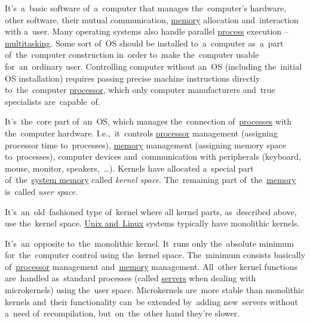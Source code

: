 
\label{os}
It's~a~basic software of~a~computer that manages the~computer's hardware, other software, their mutual communication, \hyperref[systemmemory]{memory} allocation and~interaction with a~user.
Many operating systems also handle parallel \hyperref[applicationprocessprogramservicethread]{process} execution -- \hyperref[multitasking]{multitasking}.
Some sort of~OS should be installed to~a~computer as~a~part of~the~computer construction in~order to~make the~computer usable for~an~ordinary user.
Controlling computer without an~OS (including the~initial OS installation) requires passing precise machine instructions directly to~the~computer \hyperref[processorcpucore]{processor}, which only computer manufacturers and~true specialists are~capable~of.

\label{kernel}
It's~the~core part of~an~OS, which manages the~connection of~\hyperref[applicationprocessprogramservicethread]{processes} with the~computer hardware.
I.e.,~it~controls \hyperref[processorcpucore]{processor} management (assigning processor time to~processes), \hyperref[systemmemory]{memory} management (assigning memory space to~processes), computer devices and~communication with peripherals (keyboard, mouse, monitor, speakers,~\dots).
Kernels have allocated a~special part of~the~\hyperref[systemmemory]{system memory} called \textit{kernel space}.
The~remaining part of~the~\hyperref[systemmemory]{memory} is~called \textit{user space}.

\label{monolithickernel}
It's~an~old--fashioned type of~kernel where all kernel parts, as~described above, use the~kernel space.
\hyperref[unixlinux]{Unix and~Linux} systems typically have monolithic kernels.

\label{microkernel}
It's~an~opposite to~the~monolithic kernel.
It~runs only the~absolute minimum for~the~computer control using the~kernel space.
The~minimum consists basically of~\hyperref[processorcpucore]{processor} management and~\hyperref[systemmemory]{memory} management.
All~other kernel functions are~handled as~standard processes (called \hyperref[server]{servers} when dealing with microkernels) using the~user space.
Microkernels are~more stable than monolithic kernels and~their functionality can~be extended by~adding new~servers without a~need of~recompilation, but~on~the~other hand they're slower.

